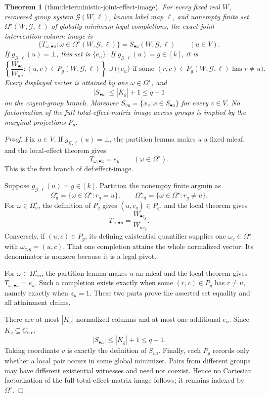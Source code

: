 \documentclass{article}
\newtheorem{theorem}{Theorem}
\begin{document}
\begin{theorem}[thm:deterministic-joint-effect-image]\label{thm:deterministic-joint-effect-image}
For every fixed real \(W\), recovered group system \(\mathcal G(W,\ell)\), known label map \(\ell\), and nonempty finite set \(\Omega^{\star}(W,\mathcal G,\ell)\) of globally minimum legal completions, the exact joint intervention-column image is
\[
\{T_{\omega,\bullet u}:\omega\in\Omega^{\star}(W,\mathcal G,\ell)\}
=S_{\bullet u}(W,\mathcal G,\ell)
\qquad(u\in V).
\]
If \(g_{\mathcal G,\ell}(u)=\bot\), this set is \(\{e_u\}\).  If \(g_{\mathcal G,\ell}(u)=g\in[k]\), it is
\[
\left\{\frac{W_{\bullet c}}{W_{uc}}:(u,c)\in P_g(W,\mathcal G,\ell)\right\}
\cup
\bigl(\{e_u\}\text{ if some }(r,c)\in P_g(W,\mathcal G,\ell)\text{ has }r\ne u\bigr).
\]
Every displayed vector is attained by one \(\omega\in\Omega^{\star}\), and
\[
|S_{\bullet u}|\le |K_g|+1\le q+1
\]
on the cogent-group branch.  Moreover \(S_{vu}=\{x_v:x\in S_{\bullet u}\}\) for every \(v\in V\).  No factorization of the full total-effect-matrix image across groups is implied by the marginal projections \(P_g\).
\end{theorem}
\begin{proof}
Fix \(u\in V\). If \(g_{\mathcal G,\ell}(u)=\bot\), the partition lemma makes \(u\) a fixed mleaf, and the local-effect theorem gives
\[
T_{\omega,\bullet u}=e_u\qquad(\omega\in\Omega^\star).
\]
This is the first branch of \(\text{def:effect-image}\).

Suppose \(g_{\mathcal G,\ell}(u)=g\in[k]\). Partition the nonempty finite argmin as
\[
\Omega_u^\star=\{\omega\in\Omega^\star:r_g=u\},
\qquad
\Omega_{\neg u}^\star=\{\omega\in\Omega^\star:r_g\ne u\}.
\]
For \(\omega\in\Omega_u^\star\), the definition of \(P_g\) gives \((u,c_g)\in P_g\), and the local theorem gives
\[
T_{\omega,\bullet u}=\frac{W_{\bullet c_g}}{W_{uc_g}}.
\]
Conversely, if \((u,c)\in P_g\), its defining existential quantifier supplies one \(\omega_c\in\Omega^\star\) with \(\omega_{c,g}=(u,c)\). That one completion attains the whole normalized vector. Its denominator is nonzero because it is a legal pivot.

For \(\omega\in\Omega_{\neg u}^\star\), the partition lemma makes \(u\) an mleaf and the local theorem gives \(T_{\omega,\bullet u}=e_u\). Such a completion exists exactly when some \((r,c)\in P_g\) has \(r\ne u\), namely exactly when \(z_u=1\). These two parts prove the asserted set equality and all attainment claims.

There are at most \(|K_g|\) normalized columns and at most one additional \(e_u\). Since \(K_g\subseteq C_{\mathrm{src}}\),
\[
|S_{\bullet u}|\le |K_g|+1\le q+1.
\]
Taking coordinate \(v\) is exactly the definition of \(S_{vu}\). Finally, each \(P_g\) records only whether a local pair occurs in some global minimizer. Pairs from different groups may have different existential witnesses and need not coexist. Hence no Cartesian factorization of the full total-effect-matrix image follows; it remains indexed by \(\Omega^\star\).
\end{proof}
\end{document}
